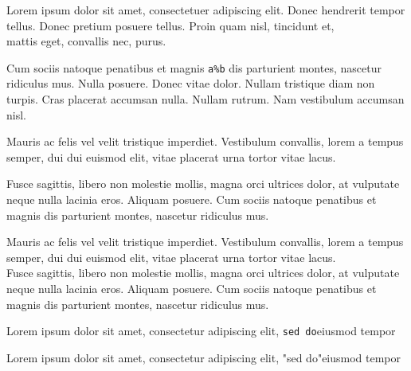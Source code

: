 \documentclass{article}
\begin{document}
Lorem ipsum dolor sit amet, consectetuer adipiscing elit. Donec
hendrerit tempor tellus. Donec pretium posuere tellus. Proin quam
nisl, tincidunt et, \\%
mattis eget, convallis nec, purus.

Cum sociis natoque penatibus et magnis \verb|a%b| dis parturient
montes, nascetur ridiculus mus. Nulla posuere. Donec vitae
dolor. Nullam tristique diam non turpis.  Cras placerat accumsan
nulla. Nullam rutrum. Nam vestibulum accumsan nisl.

Mauris ac felis vel velit tristique imperdiet.  Vestibulum convallis,
lorem a tempus semper, dui dui euismod elit, vitae placerat urna
tortor vitae lacus.\par
Fusce sagittis, libero non molestie mollis, magna orci ultrices dolor,
at vulputate neque nulla lacinia eros.  Aliquam posuere.  Cum sociis
natoque penatibus et magnis dis parturient montes, nascetur ridiculus
mus.%

Mauris ac felis vel velit tristique imperdiet.  Vestibulum convallis,
lorem a
tempus semper, dui dui euismod elit, vitae placerat urna tortor vitae lacus.\\
Fusce sagittis, libero non molestie mollis, magna orci ultrices dolor,
at vulputate neque nulla lacinia eros.  Aliquam posuere.  Cum sociis
natoque penatibus et magnis dis parturient montes, nascetur ridiculus
mus.%

Lorem ipsum dolor sit amet, consectetur adipiscing elit,
\verb|sed do|eiusmod tempor

Lorem ipsum dolor sit amet, consectetur adipiscing elit,
"sed do"eiusmod tempor
\end{document}
